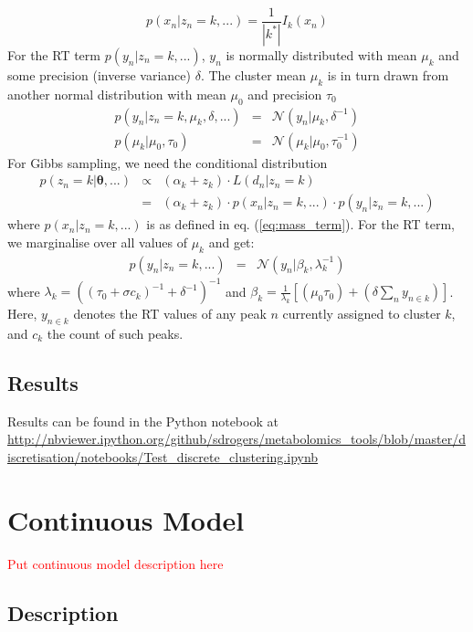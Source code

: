 \documentclass[12pt,a4paper]{article}
\newcommand\todo[1]{\textcolor{red}{#1}}
\begin{document}
\begin{equation}
p(x_{n}|z_{n}=k,...)=\frac{1}{|k^{*}|}I_{k}(x_{n})\label{eq:mass_term}
\end{equation}
For the RT term $p(y_{n}|z_{n}=k,...)$, $y_{n}$ is normally distributed with mean $\mu_{k}$ and some precision (inverse variance) $\delta$. The cluster mean $\mu_{k}$ is in turn drawn from another normal distribution with mean $\mu_{0}$ and precision $\tau_{0}$
\begin{eqnarray}
p(y_{n}|z_{n}=k,\mu_{k},\delta,...) & = & \mathcal{{N}}(y_{n}|\mu_{k},\delta^{-1})\\
p(\mu_{k}|\mu_{0},\tau_{0}) & = & \mathcal{{N}}(\mu_{k}|\mu_{0},\tau_{0}^{-1})
\end{eqnarray}
For Gibbs sampling, we need the conditional distribution
\begin{eqnarray}
p(z_{n}=k|\boldsymbol{\theta},...) & \propto & (\alpha_{k}+z_{k})\cdot L(d_{n}|z_{n}=k)\\
 & = & (\alpha_{k}+z_{k})\cdot p(x_{n}|z_{n}=k,...)\cdot p(y_{n}|z_{n}=k,...)
\end{eqnarray}
where $p(x_{n}|z_{n}=k,...)$ is as defined in eq. (\ref{eq:mass_term}).
For the RT term, we marginalise over all values
of $\mu_{k}$ and get: 
\begin{eqnarray}
p(y_{n}|z_{n}=k,...) & = & \mathcal{N}(y_{n}|\beta_{k},\lambda_{k}^{-1})\label{eq:15}
\end{eqnarray}
where $\lambda_{k}=((\tau_{0}+\sigma c_{k})^{-1}+\delta^{-1})^{-1}$ and $\beta_{k}=\frac{1}{\lambda_{k}}\left[(\mu_{0}\tau_{0})+(\delta\sum_{n}y_{n\in k})\right]$. Here, $y_{n\in k}$ denotes the RT values of any peak $n$ currently assigned to cluster $k$, and $c_{k}$ the count of such peaks.

\subsection{Results}

Results can be found in the Python notebook at \url{http://nbviewer.ipython.org/github/sdrogers/metabolomics_tools/blob/master/discretisation/notebooks/Test_discrete_clustering.ipynb}

\section{Continuous Model}

\todo{Put continuous model description here}

\subsection{Description}
\end{document}
